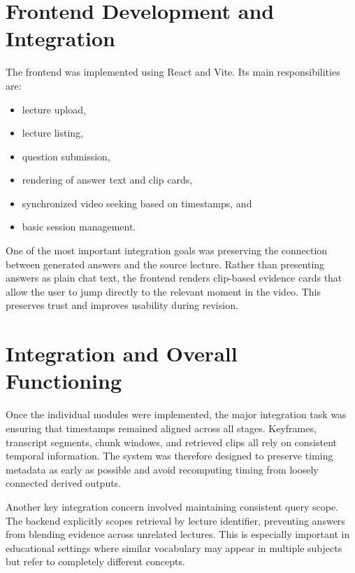 \documentclass[12pt,a4paper,oneside]{report}
\begin{document}
\section{Frontend Development and Integration}
The frontend was implemented using React and Vite. Its main responsibilities are:
\begin{itemize}
    \item lecture upload,
    \item lecture listing,
    \item question submission,
    \item rendering of answer text and clip cards,
    \item synchronized video seeking based on timestamps, and
    \item basic session management.
\end{itemize}

One of the most important integration goals was preserving the connection between generated answers and the source lecture. Rather than presenting answers as plain chat text, the frontend renders clip-based evidence cards that allow the user to jump directly to the relevant moment in the video. This preserves trust and improves usability during revision.

\section{Integration and Overall Functioning}
Once the individual modules were implemented, the major integration task was ensuring that timestamps remained aligned across all stages. Keyframes, transcript segments, chunk windows, and retrieved clips all rely on consistent temporal information. The system was therefore designed to preserve timing metadata as early as possible and avoid recomputing timing from loosely connected derived outputs.

Another key integration concern involved maintaining consistent query scope. The backend explicitly scopes retrieval by lecture identifier, preventing answers from blending evidence across unrelated lectures. This is especially important in educational settings where similar vocabulary may appear in multiple subjects but refer to completely different concepts.
\end{document}
